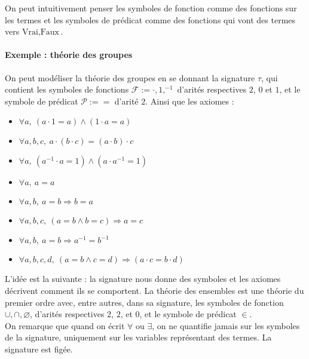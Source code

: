 \documentclass[a4paper,12pt]{article}
\theoremstyle{plain}
\begin{document}
On peut intuitivement penser les symboles de fonction comme des fonctions sur les termes et les symboles de prédicat comme des fonctions qui vont des termes vers ${ \text{Vrai}, \text{Faux}}$.

\paragraph{Exemple : théorie des groupes}

On peut modéliser la théorie des groupes en se donnant la signature $\tau$, qui contient les symboles de fonctions $\mathcal{F} := { \cdot , 1, ^{-1}}$ d'arités respectives $2$, $0$ et $1$, et le symbole de prédicat $\mathcal{P} := {=}$ d'arité $2$. Ainsi que les axiomes :

\begin{itemize}
\setlength\itemsep{ -1.5 em}
\item $\forall a, \ (a \cdot 1 = a) \land (1 \cdot a = a)$\\
\item $\forall a,b,c, \ a \cdot (b \cdot c) =  (a \cdot b) \cdot c$\\
\item $\forall a, \ ( a^{-1} \cdot a = 1) \land (a \cdot a^{-1} = 1)$\\
\item $\forall a, \ a=a$\\
\item $\forall a,b, \ a=b \Rightarrow b=a$\\
\item $\forall a,b,c, \ (a=b \land b=c) \Rightarrow a = c$\\
\item $\forall a,b, \ a=b \Rightarrow a^{-1} = b^{-1}$\\
\item $\forall a,b,c,d, \ (a=b \land c=d) \Rightarrow(a \cdot c = b \cdot d)$
\end{itemize}

L'idée est la suivante : la signature nous donne des symboles et les axiomes décrivent comment ils se comportent. La théorie des ensembles est une théorie du premier ordre avec, entre autres, dans sa signature, les symboles de fonction ${ \cup, \cap, \varnothing}$, d'arités respectives $2$, $2$, et $0$, et le symbole de prédicat $\in$.\\

On remarque que quand on écrit $\forall$ ou $\exists$, on ne quantifie jamais sur les symboles de la signature, uniquement sur les variables représentant des termes. La signature est figée.
\end{document}
